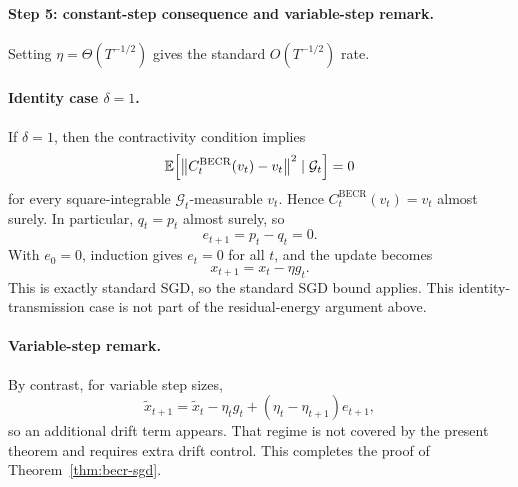 \paragraph{Step 5: constant-step consequence and variable-step remark.}
Setting $\eta=\Theta(T^{-1/2})$ gives the standard $O(T^{-1/2})$ rate.

\paragraph{Identity case $\delta=1$.}
If $\delta=1$, then the contractivity condition implies
\[
\mathbb{E}\!\left[\left\lVert C_t^{\mathrm{BECR}}(v_t)-v_t \right\rVert^2\mid \mathcal G_t\right]=0
\]
for every square-integrable $\mathcal G_t$-measurable $v_t$. Hence
$C_t^{\mathrm{BECR}}(v_t)=v_t$ almost surely. In particular, $q_t=p_t$
almost surely, so
\[
e_{t+1}=p_t-q_t=0.
\]
With $e_0=0$, induction gives $e_t=0$ for all $t$, and the update becomes
\[
x_{t+1}=x_t-\eta g_t.
\]
This is exactly standard SGD, so the standard SGD bound applies. This
identity-transmission case is not part of the residual-energy argument above.

\paragraph{Variable-step remark.}
By contrast, for variable step sizes,
\[
\tilde x_{t+1}
=
\tilde x_t-\eta_t g_t+(\eta_t-\eta_{t+1})e_{t+1},
\]
so an additional drift term appears. That regime is not covered by the present
theorem and requires extra drift control. This completes the proof of
Theorem~\ref{thm:becr-sgd}.
